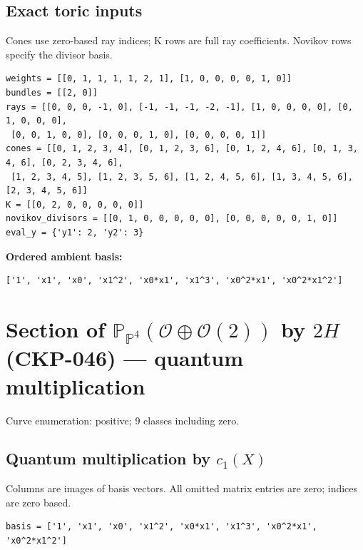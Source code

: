 \documentclass[10pt,a4paper]{article}
\begin{document}
\subsection*{Exact toric inputs}
Cones use zero-based ray indices; K rows are full ray coefficients. Novikov rows specify the divisor basis.

\begin{lstlisting}
weights = [[0, 1, 1, 1, 1, 2, 1], [1, 0, 0, 0, 0, 1, 0]]
bundles = [[2, 0]]
rays = [[0, 0, 0, -1, 0], [-1, -1, -1, -2, -1], [1, 0, 0, 0, 0], [0, 1, 0, 0, 0],
 [0, 0, 1, 0, 0], [0, 0, 0, 1, 0], [0, 0, 0, 0, 1]]
cones = [[0, 1, 2, 3, 4], [0, 1, 2, 3, 6], [0, 1, 2, 4, 6], [0, 1, 3, 4, 6], [0, 2, 3, 4, 6],
 [1, 2, 3, 4, 5], [1, 2, 3, 5, 6], [1, 2, 4, 5, 6], [1, 3, 4, 5, 6], [2, 3, 4, 5, 6]]
K = [[0, 2, 0, 0, 0, 0, 0]]
novikov_divisors = [[0, 1, 0, 0, 0, 0, 0], [0, 0, 0, 0, 0, 1, 0]]
eval_y = {'y1': 2, 'y2': 3}
\end{lstlisting}

\textbf{Ordered ambient basis:}
\begin{lstlisting}
['1', 'x1', 'x0', 'x1^2', 'x0*x1', 'x1^3', 'x0^2*x1', 'x0^2*x1^2']
\end{lstlisting}

\clearpage\section*{Section of $\mathbb P_{\mathbb P^{4}}(\mathcal O\oplus \mathcal O(2))$ by $2H$ (CKP-046) --- quantum multiplication}

Curve enumeration: positive; 9 classes including zero.
\subsection*{Quantum multiplication by $c_1(X)$}
Columns are images of basis vectors. All omitted matrix entries are zero; indices are zero based.

\begin{lstlisting}
basis = ['1', 'x1', 'x0', 'x1^2', 'x0*x1', 'x1^3', 'x0^2*x1', 'x0^2*x1^2']
\end{lstlisting}
\end{document}
